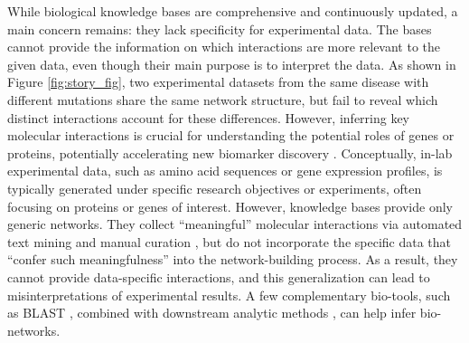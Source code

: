 While biological knowledge bases are comprehensive and continuously updated, a main concern remains: they lack specificity for experimental data.
The bases cannot provide the information on which interactions are more relevant to the given data, even though their main purpose is to interpret the data.
As shown in Figure \ref{fig:story_fig}, two experimental datasets from the same disease with different mutations share the same network structure, but fail to reveal which distinct interactions account for these differences.
However, inferring key molecular interactions is crucial for understanding the potential roles of genes or proteins, potentially accelerating new biomarker discovery \cite{bionetworkperspective2024}.
Conceptually, in-lab experimental data, such as amino acid sequences or gene expression profiles, is typically generated under specific research objectives or experiments, often focusing on proteins or genes of interest.
However, knowledge bases provide only generic networks.
They collect “meaningful” molecular interactions via automated text mining and manual curation \cite{KEGG2024}, but do not incorporate the specific data that “confer such meaningfulness” into the network-building process.
As a result, they cannot provide data-specific interactions, and this generalization can lead to misinterpretations of experimental results.
A few complementary bio-tools, such as BLAST \cite{BLAST1}, combined with downstream analytic methods \cite{enrichment}, can help infer bio-networks.
